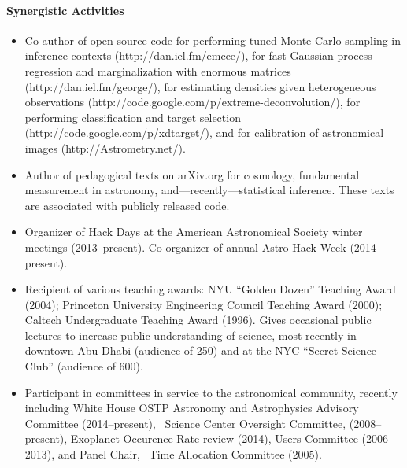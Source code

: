 \documentclass[letterpaper,12pt]{article}
\begin{document}
\paragraph{Synergistic Activities}
\begin{itemize}\setlength{\itemsep}{0pt}
\item
Co-author of open-source code
for performing tuned Monte Carlo sampling in inference contexts (http://dan.iel.fm/emcee/),
for fast Gaussian process regression and marginalization with enormous matrices (http://dan.iel.fm/george/),
for estimating densities given heterogeneous observations (http://code.google.com/p/extreme-deconvolution/),
for performing classification and target selection (http://code.google.com/p/xdtarget/),
and
for calibration of astronomical images (http://Astrometry.net/).
\item
Author of pedagogical texts on arXiv.org for cosmology, fundamental
measurement in astronomy, and---recently---statistical inference.
These texts are associated with publicly released code.
\item
Organizer of Hack Days at the American Astronomical Society winter meetings (2013--present).
Co-organizer of annual Astro Hack Week (2014--present).
\item
Recipient of various teaching awards: 
NYU ``Golden Dozen'' Teaching Award (2004);
Princeton University Engineering Council Teaching Award (2000);
Caltech Undergraduate Teaching Award (1996).
Gives occasional public lectures to increase public understanding of
science, most recently in downtown Abu Dhabi (audience of 250) and at
the NYC ``Secret Science Club'' (audience of 600).
\item
Participant in committees in service to the astronomical community,
recently including
White House OSTP Astronomy and Astrophysics Advisory Committee (2014--present),
\Spitzer\ Science Center Oversight Committee, (2008--present),
 Exoplanet Occurence Rate review (2014),
 Users Committee (2006--2013),
and
Panel Chair, \Spitzer\ Time Allocation Committee (2005).
\end{itemize}
\end{document}
